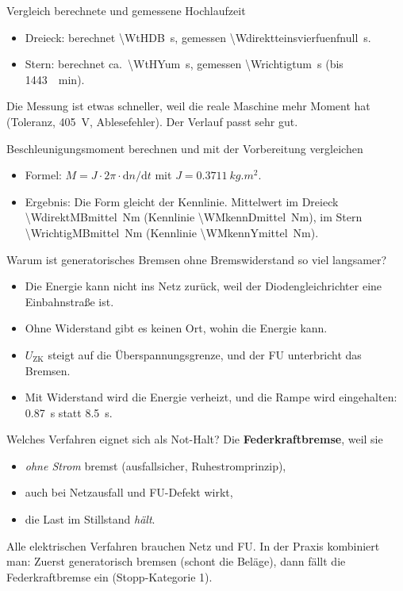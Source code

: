 \documentclass[11pt,a4paper]{article}
\begin{document}
\begin{frage}{Vergleich berechnete und gemessene Hochlaufzeit}
\begin{itemize}
\item Dreieck: berechnet \SI{\WtHDB}{s}, gemessen \SI{\Wdirektteinsvierfuenfnull}{s}.
\item Stern: berechnet ca.\ \SI{\WtHYum}{s}, gemessen \SI{\Wrichtigtum}{s} (bis \SI{1443}{\per\minute}).
\end{itemize}
Die Messung ist etwas schneller, weil die reale Maschine mehr Moment hat (Toleranz,
\SI{405}{V}, Ablesefehler). Der Verlauf passt sehr gut.
\end{frage}

\begin{frage}{Beschleunigungsmoment berechnen und mit der Vorbereitung vergleichen}
\begin{itemize}
\item Formel: $M = J\cdot2\pi\cdot\mathrm dn/\mathrm dt$ mit $J=\SI{0,3711}{kg.m^2}$.
\item Ergebnis: Die Form gleicht der Kennlinie. Mittelwert im Dreieck \SI{\WdirektMBmittel}{Nm}
      (Kennlinie \SI{\WMkennDmittel}{Nm}), im Stern \SI{\WrichtigMBmittel}{Nm}
      (Kennlinie \SI{\WMkennYmittel}{Nm}).
\end{itemize}
\end{frage}

\begin{frage}{Warum ist generatorisches Bremsen ohne Bremswiderstand so viel langsamer?}
\begin{itemize}
\item Die Energie kann nicht ins Netz zurück, weil der Diodengleichrichter eine Einbahnstraße ist.
\item Ohne Widerstand gibt es keinen Ort, wohin die Energie kann.
\item $U_\mathrm{ZK}$ steigt auf die Überspannungsgrenze, und der FU unterbricht das Bremsen.
\item Mit Widerstand wird die Energie verheizt, und die Rampe wird eingehalten:
      \SI{0,87}{s} statt \SI{8,5}{s}.
\end{itemize}
\end{frage}

\begin{frage}{Welches Verfahren eignet sich als Not-Halt?}
Die \textbf{Federkraftbremse}, weil sie
\begin{itemize}
\item \emph{ohne Strom} bremst (ausfallsicher, Ruhestromprinzip),
\item auch bei Netzausfall und FU-Defekt wirkt,
\item die Last im Stillstand \emph{hält}.
\end{itemize}
Alle elektrischen Verfahren brauchen Netz und FU.
In der Praxis kombiniert man: Zuerst generatorisch bremsen (schont die Beläge), dann fällt die
Federkraftbremse ein (Stopp-Kategorie 1).
\end{frage}
\end{document}
